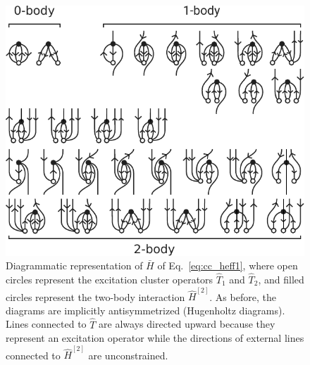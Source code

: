 \begin{figure}
  \includegraphics{fig-diagrams-ccsd.pdf} \caption{Diagrammatic
  representation of $\bar{H}$ of Eq.~\eqref{eq:cc_heff1}, where open
  circles represent the excitation cluster operators $\hat{T}_{1}$ and
  $\hat{T}_{2}$, and filled circles represent the two-body interaction
  $\hat{H}^{[2]}$.  As before, the diagrams are implicitly
  antisymmetrized (Hugenholtz diagrams).  Lines connected to $\hat{T}$
  are always directed upward because they represent an excitation
  operator while the directions of external lines connected to
  $\hat{H}^{[2]}$ are unconstrained.}  \label{fig:diagrams-ccsd}
\end{figure}

